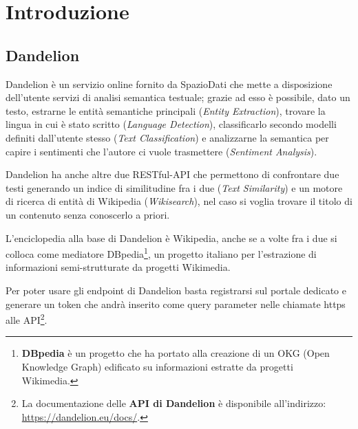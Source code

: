 \chapter{Introduzione}
\section{Dandelion}

Dandelion è un servizio online fornito da SpazioDati che mette a disposizione dell'utente servizi di analisi semantica testuale; 
grazie ad esso è possibile, dato un testo, estrarne le entità semantiche principali (\textit{Entity Extraction}\cite{entity-extraction-demo}), trovare la lingua in cui è stato 
scritto (\textit{Language Detection}), classificarlo secondo modelli definiti dall'utente stesso (\textit{Text Classification}\cite{text-classification-demo}) e analizzarne la semantica 
per capire i sentimenti che l'autore ci vuole trasmettere (\textit{Sentiment Analysis}\cite{sentiment-analysis-demo}). 

Dandelion ha anche altre due RESTful-API\cite{rest, api} che permettono di confrontare due testi generando un indice di similitudine fra i due
(\textit{Text Similarity}\cite{text-similarity-demo}) e un motore di ricerca di entità di Wikipedia (\textit{Wikisearch}), nel caso si voglia trovare il titolo 
di un contenuto senza conoscerlo a priori.

L'enciclopedia alla base di Dandelion è Wikipedia, anche se a volte fra i due si colloca come mediatore DBpedia\footnote{
    \textbf{DBpedia}\cite{dbpedia} è un progetto che ha portato alla creazione di un OKG (Open Knowledge Graph) edificato su informazioni estratte da progetti Wikimedia\cite{wikimedia}. 
}, un progetto italiano per l'estrazione di informazioni semi-strutturate da progetti Wikimedia. 

Per poter usare gli endpoint di Dandelion basta registrarsi\cite{dandelion-registration} sul portale dedicato e generare un token che andrà inserito come query parameter nelle 
chiamate https alle API\footnote{
    La documentazione delle \textbf{API di Dandelion} è disponibile all'indirizzo: \href{https://dandelion.eu/docs/}{https://dandelion.eu/docs/}.
}.

